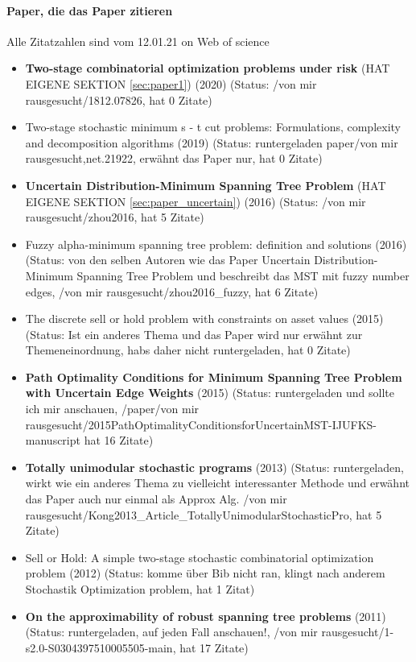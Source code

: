 \documentclass[paper=a4,10pt]{scrartcl}
\begin{document}
\paragraph{Paper, die das Paper zitieren}
Alle Zitatzahlen sind vom 12.01.21 on Web of science
\begin{itemize}
\item \textbf{Two-stage combinatorial optimization problems under risk} (HAT EIGENE SEKTION \ref{sec:paper1}) (2020) (Status: /von mir rausgesucht/1812.07826, hat 0 Zitate)
\item Two-stage stochastic minimum s - t cut problems: Formulations, complexity and decomposition algorithms (2019) (Status: runtergeladen paper/von mir rausgesucht,net.21922, erwähnt das Paper nur, hat 0 Zitate)
\item  \textbf{Uncertain Distribution-Minimum Spanning Tree Problem} (HAT EIGENE SEKTION \ref{sec:paper_uncertain}) (2016) (Status: /von mir rausgesucht/zhou2016, hat 5 Zitate)
\item  Fuzzy alpha-minimum spanning tree problem: definition and solutions (2016) (Status: von den selben Autoren wie das Paper Uncertain Distribution-Minimum Spanning Tree Problem und beschreibt das MST mit fuzzy number edges, /von mir rausgesucht/zhou2016\_fuzzy, hat 6 Zitate)
\item  The discrete sell or hold problem with constraints on asset values (2015) (Status: Ist ein anderes Thema und das Paper wird nur erwähnt zur Themeneinordnung, habs daher nicht runtergeladen, hat 0 Zitate)
\item  \textbf{Path Optimality Conditions for Minimum Spanning Tree Problem with Uncertain Edge Weights} (2015) (Status: runtergeladen und sollte ich mir anschauen, /paper/von mir rausgesucht/2015PathOptimalityConditionsforUncertainMST-IJUFKS-manuscript hat 16 Zitate)
\item  \textbf{Totally unimodular stochastic programs} (2013) (Status: runtergeladen, wirkt wie ein anderes Thema zu vielleicht interessanter Methode und erwähnt das Paper auch nur einmal als Approx Alg. /von mir rausgesucht/Kong2013\_Article\_TotallyUnimodularStochasticPro, hat 5 Zitate) 
\item  Sell or Hold: A simple two-stage stochastic combinatorial optimization problem (2012) (Status: komme über Bib nicht ran, klingt nach anderem Stochastik Optimization problem, hat 1 Zitat)
\item  \textbf{On the approximability of robust spanning tree problems} (2011) (Status: runtergeladen, auf jeden Fall anschauen!, /von mir rausgesucht/1-s2.0-S0304397510005505-main, hat 17 Zitate) 

\end{itemize}
\end{document}
